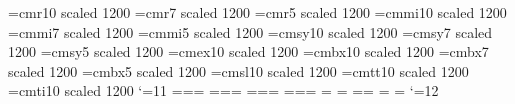 %
%
%
%
%
\font\tenrm  =cmr10  scaled 1200
\font\sevenrm=cmr7   scaled 1200
\font\fiverm =cmr5   scaled 1200
\font\teni   =cmmi10 scaled 1200
\font\seveni =cmmi7  scaled 1200
\font\fivei  =cmmi5  scaled 1200
\font\tensy  =cmsy10 scaled 1200
\font\sevensy=cmsy7  scaled 1200
\font\fivesy =cmsy5  scaled 1200
\font\tenex  =cmex10 scaled 1200
\font\tenbf  =cmbx10 scaled 1200
\font\sevenbf=cmbx7  scaled 1200
\font\fivebf =cmbx5  scaled 1200
\font\tensl  =cmsl10 scaled 1200
\font\tentt  =cmtt10 scaled 1200
\font\tenit  =cmti10 scaled 1200
%
%
\catcode`\@=11
% 
%
=\tenrm {}=\sevenrm {}=\fiverm
\def\rm{\fam\z@\tenrm}
%
%
=\teni  {}=\seveni  {}=\fivei
\def\mit{\fam\@ne} 
\def\oldstyle{\fam\@ne\teni}
%
%
=\tensy {}=\sevensy {}=\fivesy
\def\cal{\fam\tw@}
%
%
=\tenex {}=\tenex   {}=\tenex
%
%
\newfam\itfam \def\it{\fam\itfam\tenit} 
\textfont\itfam=\tenit
%
%
\newfam\slfam \def\sl{\fam\slfam\tensl} 
\textfont\slfam=\tensl
%
%
\newfam\bffam \def\bf{\fam\bffam\tenbf} 
\textfont\bffam=\tenbf \scriptfont\bffam=\sevenbf
\scriptscriptfont\bffam=\fivebf
%
%
\newfam\ttfam \def\tt{\fam\ttfam\tentt} 
\textfont\ttfam=\tentt
%
\catcode`\@=12
%
%
